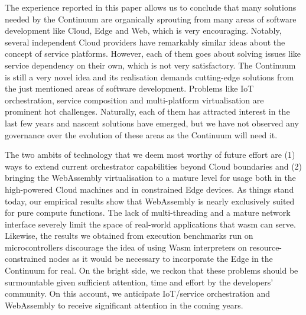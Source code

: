 The experience reported in this paper allows us to conclude that many solutions needed by the Continuum are organically sprouting from many areas of software development like Cloud, Edge and Web, which is very encouraging. 
Notably, several independent Cloud providers have remarkably similar ideas about the concept of service platforms. However, each of them goes about solving issues like service dependency on their own, which is not very satisfactory. 
The Continuum is still a very novel idea and its realisation demands cutting-edge solutions from the just mentioned areas of software development. 
Problems like IoT orchestration, service composition and multi-platform virtualisation are prominent hot challenges. Naturally, each of them has attracted interest in the last few years and nascent solutions have emerged, but we have not observed any governance over the evolution of these areas as the Continuum will need it.

The two ambits of technology that we deem most worthy of future effort are (1) ways to extend current orchestrator capabilities beyond Cloud boundaries and (2) bringing the WebAssembly virtualisation to a mature level for usage both in the high-powered Cloud machines and in constrained Edge devices. 
As things stand today, our empirical results show that WebAssembly is nearly exclusively suited for pure compute functions. 
The lack of multi-threading and a mature network interface severely limit the space of real-world applications that wasm can serve.
Likewise, the results we obtained from execution benchmarks run on microcontrollers discourage the idea of using Wasm interpreters on resource-constrained nodes as it would be necessary to incorporate the Edge in the Continuum for real. 
On the bright side, we reckon that these problems should be surmountable given sufficient attention, time and effort by the developers' community. On this account, we anticipate IoT/service orchestration and WebAssembly to receive significant attention in the coming years.
